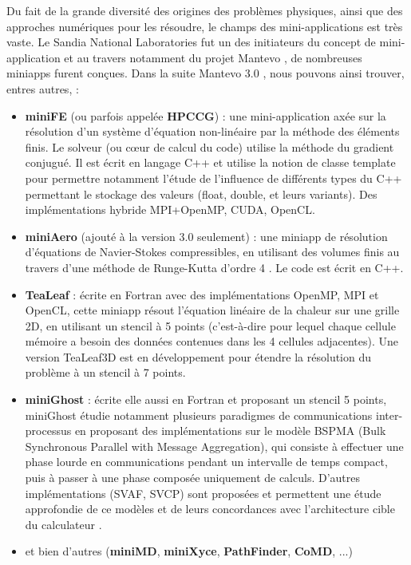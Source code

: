 \documentclass[11pt,a4paper,oneside]{memoir}
\theoremstyle{definition}
\theoremstyle{remark}
\theoremstyle{plain}
\begin{document}
Du fait de la grande diversité des origines des problèmes physiques, ainsi que des approches numériques pour les résoudre, le champs des mini-applications est très vaste. Le Sandia National Laboratories fut un des initiateurs du concept de mini-application et au travers notamment du projet Mantevo \cite{mantevo-project}, de nombreuses miniapps furent conçues. Dans la suite Mantevo 3.0 \cite{heroux2015}, nous pouvons ainsi trouver, entres autres, :
\begin{itemize}
\item \textbf{miniFE} (ou parfois appelée \textbf{HPCCG}) : une mini-application axée sur la résolution d'un système d'équation non-linéaire par la méthode des éléments finis. Le solveur (ou cœur de calcul du code) utilise la méthode du gradient conjugué. Il est écrit en langage C++ et utilise la notion de classe template pour permettre notamment l'étude de l'influence de différents types du C++ permettant le stockage des valeurs (float, double, et leurs variants). Des implémentations hybride MPI+OpenMP, CUDA, OpenCL.
\item \textbf{miniAero} (ajouté à la version 3.0 seulement) : une miniapp de résolution d'équations de Navier-Stokes compressibles, en utilisant des volumes finis au travers d'une méthode de Runge-Kutta d'ordre 4 \cite{miniaero-code}. Le code est écrit en C++.
\item \textbf{TeaLeaf} : écrite en Fortran avec des implémentations OpenMP, MPI et OpenCL, cette miniapp résout l'équation linéaire de la chaleur sur une grille 2D, en utilisant un stencil à 5 points (c'est-à-dire pour lequel chaque cellule mémoire a besoin des données contenues dans les 4 cellules adjacentes). Une version TeaLeaf3D est en développement pour étendre la résolution du problème à un stencil à 7 points. \cite{tealeaf}
\item \textbf{miniGhost} : écrite elle aussi en Fortran et proposant un stencil 5 points, miniGhost étudie notamment plusieurs paradigmes de communications inter-processus en proposant des implémentations sur le modèle BSPMA (Bulk Synchronous Parallel with Message Aggregation), qui consiste à effectuer une phase lourde en communications pendant un intervalle de temps compact, puis à passer à une phase composée uniquement de calculs. D'autres implémentations (SVAF, SVCP) sont proposées et permettent une étude approfondie de ce modèles et de leurs concordances avec l'architecture cible du calculateur \cite{barrett2012}.
\item et bien d'autres (\textbf{miniMD}, \textbf{miniXyce}, \textbf{PathFinder}, \textbf{CoMD}, ...) \cite{heroux2015}
\end{itemize}\bigskip
\end{document}
